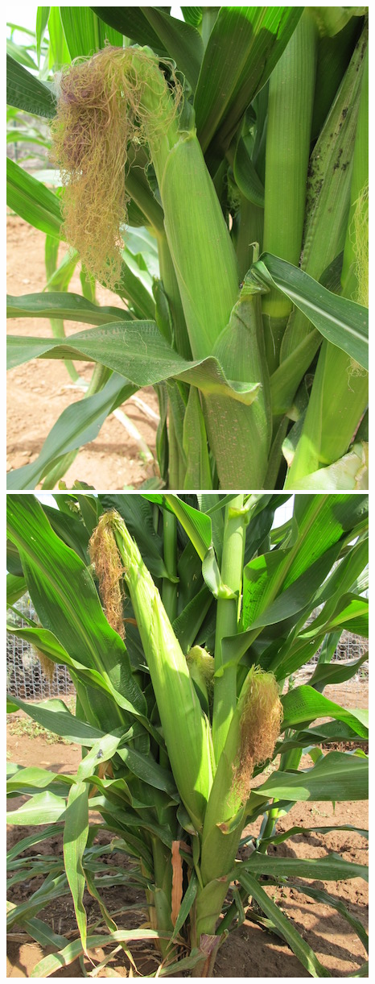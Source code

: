 \documentclass[12pt,]{article}
\begin{document}
\includegraphics{./images/growth/11_ear_development.jpg}
\includegraphics{./images/growth/12_ear_development.jpg}
\end{document}

